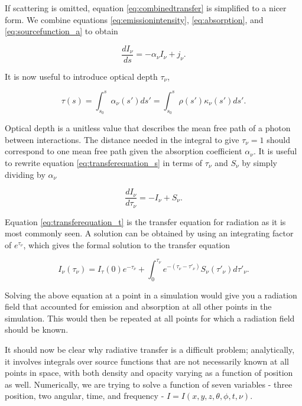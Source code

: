 If scattering is omitted, equation \ref{eq:combinedtransfer} is simplified to a nicer form. We combine equations \ref{eq:emissionintensity}, \ref{eq:absorption}, and \ref{eq:sourcefunction_a} to obtain

\begin{equation}
\label{eq:transferequation_s}
\frac{dI_{\nu}}{ds} = -\alpha_{\nu}I_{\nu} + j_{\nu}.
\end{equation}

It is now useful to introduce optical depth $\tau_{\nu}$,

\begin{equation}
\label{eq:opticaldepth}
\tau(s) = \int_{s_0}^{s} \alpha_{\nu}(s')ds' = \int_{s_0}^{s} \rho(s') \kappa_{\nu}(s') ds'.
\end{equation}

Optical depth is a unitless value that describes the mean free path of a photon between interactions. The distance needed in the integral to give $\tau_{\nu} = 1$ should correspond to one mean free path given the absorption coefficient $\alpha_{\nu}$. It is useful to rewrite equation \ref{eq:transferequation_s} in terms of $\tau_{\nu}$ and $S_{\nu}$ by simply dividing by $\alpha_{\nu}$

\begin{equation}
\label{eq:transferequation_t}
\frac{dI_{\nu}}{d\tau_{\nu}} = -I_{\nu} + S_{\nu}.
\end{equation}

Equation \ref{eq:transferequation_t} is the transfer equation for radiation as it is most commonly seen. A solution can be obtained by using an integrating factor of $e^{\tau_{\nu}}$, which gives the formal solution to the transfer equation

\begin{equation}
\label{eq:transferequationsolution}
I_{\nu}(\tau_{\nu}) = I_{\tau}(0)e^{-\tau_{\nu}} + \int_0^{\tau_{\nu}} e^{-(\tau_\nu - \tau'_{\nu})} S_{\nu}(\tau'_{\nu})d\tau'_{\nu}.
\end{equation}

Solving the above equation at a point in a simulation would give you a radiation field that accounted for emission and absorption at all other points in the simulation. This would then be repeated at all points for which a radiation field should be known.

It should now be clear why radiative transfer is a difficult problem; analytically, it involves integrals over source functions that are not necessarily known at all points in space, with both density and opacity varying as a function of position as well. Numerically, we are trying to solve a function of seven variables - three position, two angular, time, and frequency - $I = I(x,y,z,\theta,\phi,t,\nu)$.

